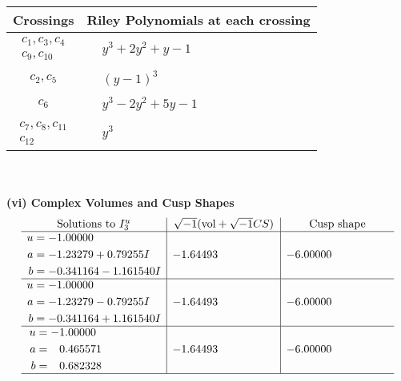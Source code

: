 \documentclass[1p]{elsarticle_modified}
\theoremstyle{definition}
\newcommand{\I}{\sqrt{-1}}
\begin{document}
\begin{tabular}{m{50pt}|m{274pt}}
Crossings & \hspace{64pt}Riley Polynomials at each crossing \\
\hline $$\begin{aligned}c_{1},c_{3},c_{4}\\c_{9},c_{10}\end{aligned}$$&$\begin{aligned}
&y^3+2 y^2+y-1
\end{aligned}$\\
\hline $$\begin{aligned}c_{2},c_{5}\end{aligned}$$&$\begin{aligned}
&(y-1)^3
\end{aligned}$\\
\hline $$\begin{aligned}c_{6}\end{aligned}$$&$\begin{aligned}
&y^3-2 y^2+5 y-1
\end{aligned}$\\
\hline $$\begin{aligned}c_{7},c_{8},c_{11}\\c_{12}\end{aligned}$$&$\begin{aligned}
&y^3
\end{aligned}$\\
\hline
\end{tabular}\\~\\
\newpage\flushleft \textbf{(vi) Complex Volumes and Cusp Shapes}
$$\begin{array}{c|c|c}  
\text{Solutions to }I^u_{3}& \I (\text{vol} + \sqrt{-1}CS) & \text{Cusp shape}\\
 \hline 
\begin{aligned}
u &= -1.00000\phantom{ +0.000000I} \\
a &= -1.23279 + 0.79255 I \\
b &= -0.341164 - 1.161540 I\end{aligned}
 & -1.64493\phantom{ +0.000000I} & -6.00000\phantom{ +0.000000I} \\ \hline\begin{aligned}
u &= -1.00000\phantom{ +0.000000I} \\
a &= -1.23279 - 0.79255 I \\
b &= -0.341164 + 1.161540 I\end{aligned}
 & -1.64493\phantom{ +0.000000I} & -6.00000\phantom{ +0.000000I} \\ \hline\begin{aligned}
u &= -1.00000\phantom{ +0.000000I} \\
a &= \phantom{-}0.465571\phantom{ +0.000000I} \\
b &= \phantom{-}0.682328\phantom{ +0.000000I}\end{aligned}
 & -1.64493\phantom{ +0.000000I} & -6.00000\phantom{ +0.000000I}\\
 \hline 
 \end{array}$$\newpage\newpage\renewcommand{\arraystretch}{1}
\end{document}
